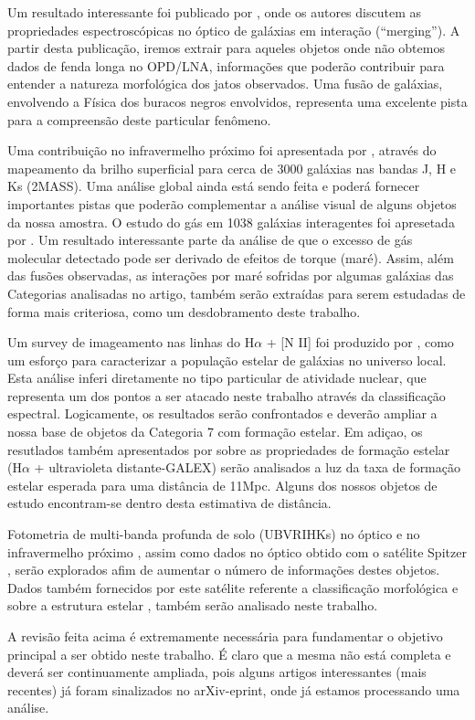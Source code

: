 Um resultado interessante foi publicado por \cite{donzelli2000spectroscopic}, onde os autores discutem as propriedades espectroscópicas no óptico de galáxias em interação (“merging”). A partir desta publicação, iremos extrair para aqueles objetos onde não obtemos dados de fenda longa no OPD/LNA, informações que poderão contribuir para entender a natureza morfológica dos jatos observados. Uma fusão de galáxias, envolvendo a Física dos buracos negros envolvidos, representa uma excelente pista para a compreensão deste particular fenômeno.

Uma contribuição no infravermelho próximo foi apresentada por \cite{monnierb,monniera}, através do mapeamento da brilho superficial para cerca de 3000 galáxias nas bandas J, H e Ks (2MASS). Uma análise global ainda está sendo feita e poderá fornecer importantes pistas que poderão complementar a análise visual de alguns objetos da nossa amostra. O estudo do gás em 1038 galáxias interagentes foi apresetada por \cite{casasola2004gas}. Um resultado interessante parte da análise de que o excesso de gás molecular detectado pode ser derivado de efeitos de torque (maré). Assim, além das fusões observadas, as interações por maré sofridas por algumas galáxias das Categorias analisadas no artigo, também serão extraídas para serem estudadas de forma mais criteriosa, como um desdobramento deste trabalho.

Um survey de imageamento nas linhas do H$\alpha$ + [N II] foi produzido por \cite{kennicutt08}, como um esforço para caracterizar a população estelar de galáxias no universo local. Esta análise inferi diretamente no tipo particular de atividade nuclear, que representa um dos pontos a ser atacado neste trabalho através da classificação espectral. Logicamente, os resultados serão confrontados e deverão ampliar a nossa base de objetos da Categoria 7 com formação estelar. Em adiçao, os resutlados também apresentados por \cite{karachentsev2013star} sobre as propriedades de formação estelar (H$\alpha$ + ultravioleta distante-GALEX) serão analisados a luz da taxa de formação estelar esperada para uma distância de 11Mpc. Alguns dos nossos objetos de estudo encontram-se dentro desta estimativa de distância.

Fotometria de multi-banda profunda de solo (UBVRIHKs) no óptico e no infravermelho próximo \cite{micheva2013deep}, assim como dados no óptico obtido com o satélite Spitzer \cite{knapp2014interpersonal}, serão explorados afim de aumentar o número de informações destes objetos. Dados também fornecidos por este satélite referente a classificação morfológica \cite{buta2015classical} e sobre a estrutura estelar \cite{salo2015}, também serão analisado neste trabalho.

A revisão feita acima é extremamente necessária para fundamentar o objetivo principal a ser obtido neste trabalho. É claro que a mesma não está completa e deverá ser continuamente ampliada, pois alguns artigos interessantes (mais recentes) já foram sinalizados no arXiv-eprint, onde já estamos processando uma análise.